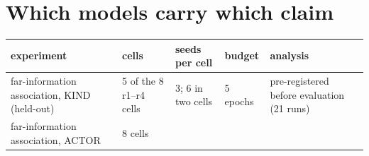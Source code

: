 \documentclass[10pt]{article}
\begin{document}


\appendix
\hypertarget{which-models-carry-which-claim}{%
\section{Which models carry which claim}\label{which-models-carry-which-claim}}

\begin{longtable}[]{@{}lllll@{}}
\toprule
\begin{minipage}[b]{0.17\columnwidth}\raggedright
experiment\strut
\end{minipage} & \begin{minipage}[b]{0.17\columnwidth}\raggedright
cells\strut
\end{minipage} & \begin{minipage}[b]{0.17\columnwidth}\raggedright
seeds per cell\strut
\end{minipage} & \begin{minipage}[b]{0.17\columnwidth}\raggedright
budget\strut
\end{minipage} & \begin{minipage}[b]{0.17\columnwidth}\raggedright
analysis\strut
\end{minipage}\tabularnewline
\midrule
\endhead
\begin{minipage}[t]{0.17\columnwidth}\raggedright
far-information association, KIND (held-out)\strut
\end{minipage} & \begin{minipage}[t]{0.17\columnwidth}\raggedright
5 of the 8 r1--r4 cells\strut
\end{minipage} & \begin{minipage}[t]{0.17\columnwidth}\raggedright
3; 6 in two cells\strut
\end{minipage} & \begin{minipage}[t]{0.17\columnwidth}\raggedright
5 epochs\strut
\end{minipage} & \begin{minipage}[t]{0.17\columnwidth}\raggedright
pre-registered before evaluation (21 runs)\strut
\end{minipage}\tabularnewline
\begin{minipage}[t]{0.17\columnwidth}\raggedright
far-information association, ACTOR\strut
\end{minipage} & \begin{minipage}[t]{0.17\columnwidth}\raggedright
8 cells\strut
\end{minipage} & \begin{minipage}[t]{0.17\columnwidth}\raggedright

\end{minipage}
\end{longtable}
\end{document}
